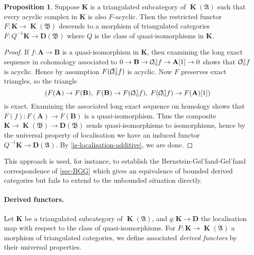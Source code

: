 \documentclass[a4paper]{article}
\theoremstyle{definition}
\newtheorem{prop}[defn]{Proposition}
\theoremstyle{remark}
\DeclareMathOperator{\cone}{\mathcal{C\kern -2pt o \kern -2pt n \kern -2pt e
\kern -2pt}}
\DeclareMathOperator{\kom}{{\mathbf{K}}}
\newcommand{\deri}{\mathbf{D}}
\begin{document}
\begin{prop}\label{smaller-trianglecat}
    Suppose \(\mathbf{K}\) is a triangulated subcategory of \(\kom(\mathfrak{A})\)
    such that every acyclic complex in \(\mathbf{K}\) is also \(F\)-acyclic.
    Then the restricted functor \(F:\mathbf{K}\rightarrow \kom(\mathfrak{B})\)
    descends to a morphism of triangulated categories \(F:
    Q^{-1}\mathbf{K}\rightarrow \deri(\mathfrak{B})\) where \(Q\) is the class
    of quasi-isomorphisms in \(\mathbf{K}\).
    \begin{proof}
        If \(f:\mathbf{A}\rightarrow \mathbf{B}\) is a quasi-isomorphism in
        \(\mathbf{K}\), then examining the long exact sequence in cohomology
        associated to \(0\rightarrow \mathbf{B}\rightarrow \cone f \rightarrow
        \mathbf{A}[1] \rightarrow 0\) shows that \(\cone f\) is acyclic. Hence
        by assumption \(F(\cone f)\) is acyclic. Now \(F\) preserves exact
        triangles, so the triangle 
        \[(F(\mathbf{A})\rightarrow F(\mathbf{B}), \; F(\mathbf{B})\rightarrow
        F(\cone f), \; F(\cone f)\rightarrow F(\mathbf{A})[1])\]
        is exact. Examining the associated long exact sequence on homology shows
        that \(F(f):F(\mathbf{A})\rightarrow F(\mathbf{B})\) is a
        quasi-isomorphism. Thus the composite \(\mathbf{K}\rightarrow
        \kom(\mathfrak{B})\rightarrow \deri(\mathfrak{B})\) sends
        quasi-isomorphisms to isomorphisms, hence by the universal property of
        localisation we have an induced functor \({Q^{-1}\mathbf{K}\rightarrow
        \deri(\mathfrak{A})}\). By \cref{is-localisation-additive}, we are done.
    \end{proof}
\end{prop}

This approach is used, for instance, to establish the
Bernstein-Gel'fand-Gel'fand correspondence of \cref{sec-BGG} which gives an
equivalence of bounded derived categories but fails to extend to the unbounded
situation directly.

\paragraph{Derived functors.} Let \(\mathbf{K}\) be a triangulated subcategory
of \(\kom(\mathfrak{A})\), and \(q:\mathbf{K}\rightarrow \mathbf{D}\) the
localisation map with respect to the class of quasi-isomorphisms. For
\(F:\mathbf{K}\rightarrow \kom(\mathfrak{A})\) a morphism of triangulated
categories, we define associated \textit{derived functors} by their universal
properties. 
\end{document}
